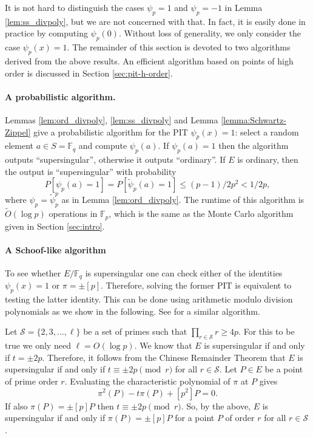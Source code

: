 \documentclass[12pt]{article}
\theoremstyle{plain}
\theoremstyle{definition}
\newcommand{\tildO}{\tilde{O}}
\def\F{\ensuremath{\mathbb{F}}}
\begin{document}
It is not hard to distinguish the cases $\psi_p = 1$ and $\psi_p = -1$ in Lemma 
\ref{lem:ss_divpoly}, but we are not concerned with that. In fact, it is easily done in practice 
by computing $\psi_p(0)$. Without loss of generality, we only consider the case $\psi_p(x) = 1$. 
The remainder of this section is devoted to two algorithms derived from the above results. An 
efficient algorithm based on points of high order is discussed in Section \ref{sec:pit-h-order}.

\paragraph{A probabilistic algorithm.}
Lemmas \ref{lem:ord_divpoly}, \ref{lem:ss_divpoly} and Lemma \ref{lemma:Schwartz-Zippel} give a 
probabilistic algorithm for the PIT $\psi_p(x) = 1$: select a random element $a \in S = \F_q$ and 
compute $\psi_p(a)$. If $\psi_p(a) = 1$ then the algorithm outputs ``supersingular'', otherwise it 
outputs ``ordinary''. If $E$ is ordinary, then the output is ``supersingular'' with probability 
\[ P[\psi_p(a) = 1] = P[\tilde{\psi}_p(a) = 1] \le (p - 1) / 2p^2 < 1 / 2p, \] 
where $\psi_p = \tilde{\psi}_p^p$ as in Lemma \ref{lem:ord_divpoly}. The runtime of this algorithm 
is $\tildO(\log p)$ operations in $\F_p$, which is the same as the Monte Carlo algorithm given in 
Section \ref{sec:intro}.

\paragraph{A Schoof-like algorithm}
To see whether $E/\F_q$ is supersingular one can check either of the identities $\psi_p(x) = 1$ or 
$\pi = \pm [p]$. Therefore, solving the former PIT is equivalent to testing the latter identity. 
This can be done using arithmetic modulo division polynomials as we show in the following. See 
\cite[Section 2.2]{sutherland2012} for a similar algorithm.

Let $\mathcal{S} = \{2, 3, \dots, \ell\}$ be a set of primes such that $\prod_{r \in \mathcal{S}} r 
\ge 4p$. For this to be true we only need $\ell = O(\log p)$. We know that $E$ is supersingular if 
and only if $t = \pm 2p$. Therefore, it follows from the Chinese Remainder Theorem that $E$ is 
supersingular if and only if $t \equiv \pm 2p \pmod{r}$ for all $r \in \mathcal{S}$. Let $P \in E$ 
be a point of prime order $r$. Evaluating the characteristic polynomial of $\pi$ at $P$ gives
\[ \pi^2(P) - t\pi(P) + [p^2]P = 0. \]
If also $\pi(P) = \pm [p]P$ then $t \equiv \pm 2p \pmod{r}$. So, by the above, $E$ is supersingular 
if and only if $\pi(P) = \pm [p]P$ for a point $P$ of order $r$ for all $r \in \mathcal{S}$.
\end{document}
